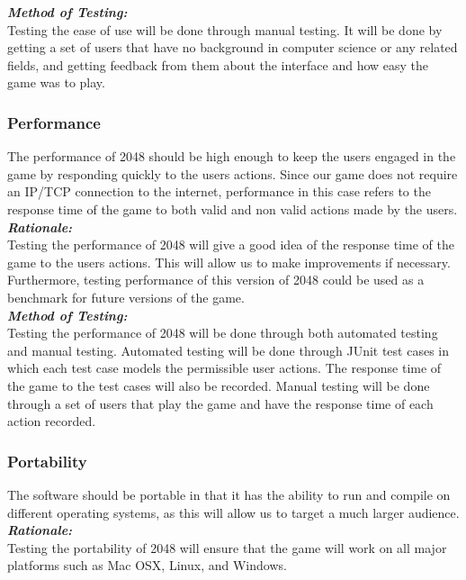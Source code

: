 \documentclass[12pt]{article}
\begin{document}
\textbf{\emph{Method of Testing:}}\\
Testing the ease of use will be done through manual testing. It will be done by
getting a set of users that have no background in computer science or any
related fields, and getting feedback from them about the interface and how easy
the game was to play.

\subsubsection{Performance}
The performance of 2048 should be high enough to keep the users engaged in the
game by responding quickly to the users actions. Since our game does not
require an IP/TCP connection to the internet, performance in this case refers
to the response time of the game to both valid and non valid actions made by
the users. \\

\textbf{\emph{Rationale:}}\\
Testing the performance of 2048 will give a good idea of the response time of
the game to the users actions. This will allow us to make improvements if
necessary. Furthermore, testing performance of this version of 2048 could be
used as a benchmark for future versions of the game. \\

\textbf{\emph{Method of Testing:}}\\
Testing the performance of 2048 will be done through both automated testing and
manual testing. Automated testing will be done through JUnit test cases in
which each test case models the permissible user actions. The response time of
the game to the test cases will also be recorded. Manual testing will be done
through a set of users that play the game and have the response time of each
action recorded.

\subsubsection{Portability}
The software should be portable in that it has the ability to run and compile
on different operating systems, as this will allow us to target a much larger
audience. \\

\textbf{\emph{Rationale:}}\\
Testing the portability of 2048 will ensure that the game will work on all
major platforms such as Mac OSX, Linux, and Windows. \\
\end{document}
